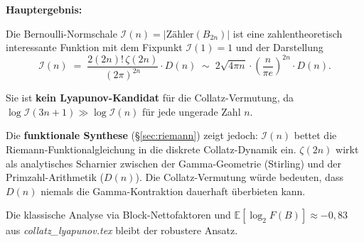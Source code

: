 \documentclass[12pt,a4paper]{article}
\newcommand{\E}{\mathbb{E}}
\newcommand{\abs}[1]{\lvert#1\rvert}
\newcommand{\logt}{\log_2}
\newcommand{\In}{\mathcal{I}}      %
\newcommand{\Denom}[1]{D(#1)}     %
\begin{document}
\begin{tcolorbox}[hauptsatz]
\textbf{Hauptergebnis:}

Die Bernoulli-Normschale $\In(n) = \abs{\text{Zähler}(B_{2n})}$ ist eine
zahlentheoretisch interessante Funktion mit dem Fixpunkt $\In(1) = 1$
und der Darstellung
\[
  \In(n) \;=\; \frac{2(2n)!\,\zeta(2n)}{(2\pi)^{2n}}\cdot\Denom{n}
  \;\sim\; 2\sqrt{4\pi n}\cdot\left(\frac{n}{\pi e}\right)^{2n}\cdot\Denom{n}.
\]

\medskip
Sie ist \textbf{kein Lyapunov-Kandidat} für die Collatz-Vermutung, da
$\log\In(3n+1) \gg \log\In(n)$ für jede ungerade Zahl $n$.

\medskip
Die \textbf{funktionale Synthese} (§\ref{sec:riemann}) zeigt jedoch: $\In(n)$ bettet
die Riemann-Funktionalgleichung in die diskrete Collatz-Dynamik ein. $\zeta(2n)$ wirkt
als analytisches Scharnier zwischen der Gamma-Geometrie (Stirling) und der
Primzahl-Arithmetik ($\Denom{n}$). Die Collatz-Vermutung würde bedeuten, dass
$\Denom{n}$ niemals die Gamma-Kontraktion dauerhaft überbieten kann.

\medskip
Die klassische Analyse via Block-Nettofaktoren und $\E[\logt F(B)] \approx -0{,}83$
aus \textit{collatz\_lyapunov.tex} bleibt der robustere Ansatz.
\end{tcolorbox}
\end{document}
